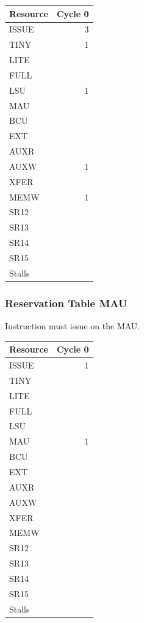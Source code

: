 \begin{tabular}{|l|r|} \hline
Resource	& Cycle 0 \\ \hline
\textsf{ISSUE}	& 3	\\
\textsf{TINY}	& 1	\\
\textsf{LITE}	& 	\\
\textsf{FULL}	& 	\\
\textsf{LSU}	& 1	\\
\textsf{MAU}	& 	\\
\textsf{BCU}	& 	\\
\textsf{EXT}	& 	\\
\textsf{AUXR}	& 	\\
\textsf{AUXW}	& 1	\\
\textsf{XFER}	& 	\\
\textsf{MEMW}	& 1	\\
\textsf{SR12}	& 	\\
\textsf{SR13}	& 	\\
\textsf{SR14}	& 	\\
\textsf{SR15}	& 	\\
\hline Stalls	& 	\\
\hline \end{tabular}

\subsubsection{Reservation Table MAU} \label{sec:reservation-MAU}

Instruction must issue on the MAU.
\medskip

\begin{tabular}{|l|r|} \hline
Resource	& Cycle 0 \\ \hline
\textsf{ISSUE}	& 1	\\
\textsf{TINY}	& 	\\
\textsf{LITE}	& 	\\
\textsf{FULL}	& 	\\
\textsf{LSU}	& 	\\
\textsf{MAU}	& 1	\\
\textsf{BCU}	& 	\\
\textsf{EXT}	& 	\\
\textsf{AUXR}	& 	\\
\textsf{AUXW}	& 	\\
\textsf{XFER}	& 	\\
\textsf{MEMW}	& 	\\
\textsf{SR12}	& 	\\
\textsf{SR13}	& 	\\
\textsf{SR14}	& 	\\
\textsf{SR15}	& 	\\
\hline Stalls	& 	\\
\hline \end{tabular}

